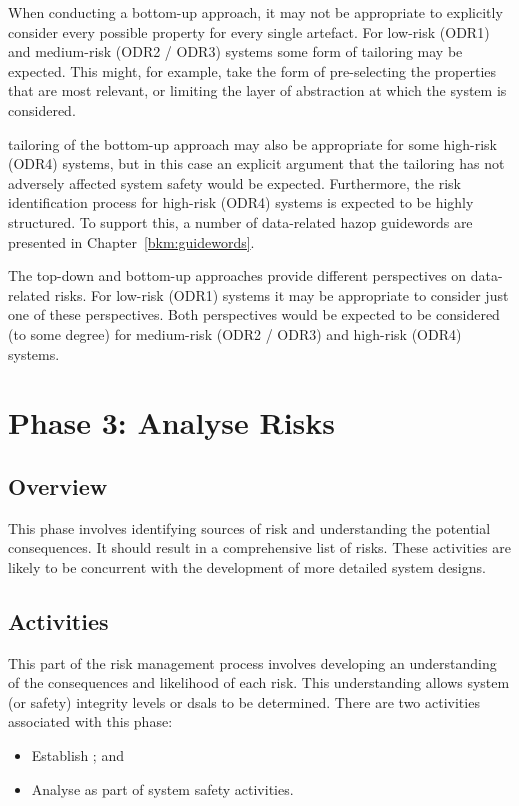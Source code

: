 When conducting a bottom-up approach, it may not be appropriate to explicitly consider every possible property for every single artefact. For low-risk (ODR1) and medium-risk (ODR2 / ODR3) systems some form of \gls{tailoring} may be expected. This might, for example, take the form of pre-selecting the properties that are most relevant, or limiting the layer of abstraction at which the system is considered.

\Gls{tailoring} of the bottom-up approach may also be appropriate for some high-risk (ODR4) systems, but in this case an explicit argument that the \gls{tailoring} has not adversely affected system safety would be expected. Furthermore, the risk identification process for high-risk (ODR4) systems is expected to be highly structured. To support this, a number of data-related \gls{hazop} guidewords are presented in Chapter~\ref{bkm:guidewords}.

The top-down and bottom-up approaches provide different perspectives on data-related risks. For low-risk (ODR1) systems it may be appropriate to consider just one of these perspectives. Both perspectives would be expected to be considered (to some degree) for medium-risk (ODR2 / ODR3) and high-risk (ODR4) systems.
\section{Phase 3: Analyse Risks}\label{bkm:analyserisks}
\subsection{Overview}
This phase involves identifying sources of risk and understanding the potential consequences. It should result in a comprehensive list of risks. These activities are likely to be concurrent with the development of more detailed system designs.

\subsection{Activities}
This part of the risk management process involves developing an understanding of the consequences and likelihood of each risk. This understanding allows system (or safety) \gls{integrity} levels or \glspl{dsal} to be determined.
%
%
There are two activities associated with this phase:
\begin{itemize}
	\item Establish ; and
	\item Analyse  as part of system safety activities.
\end{itemize}
%
